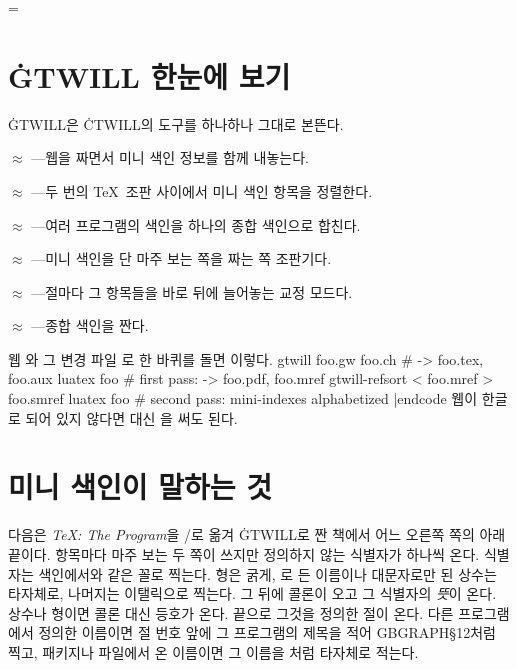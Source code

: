 \headline={\ifodd\pageno\rheader\else\lheader\fi}

\chapter{\.{GTWILL} 한눈에 보기}
\noindent\.{GTWILL}은 \.{CTWILL}의 도구를 하나하나 그대로 본뜬다.

\bull {} $\approx$ ---웹을 짜면서 미니 색인 정보를 함께
내놓는다.

\bull {} $\approx$ ---두 번의 \TeX\ 조판 사이에서
미니 색인 항목을 정렬한다.

\bull {} $\approx$ ---여러 프로그램의 색인을 하나의
종합 색인으로 합친다.

\bull {} $\approx$ ---미니 색인을 단 마주 보는 쪽을
짜는 쪽 조판기다.

\bull {} $\approx$ ---절마다 그 항목들을 바로
뒤에 늘어놓는 교정 모드다.

\bull {} $\approx$ ---종합 색인을 짠다.

\noindent 웹 와 그 변경 파일 로 한 바퀴를 돌면 이렇다.
\begincode
gtwill foo.gw foo.ch                  # -> foo.tex, foo.aux
luatex foo                            # first pass: -> foo.pdf, foo.mref
gtwill-refsort < foo.mref > foo.smref
luatex foo                            # second pass: mini-indexes alphabetized
|endcode
웹이 한글로 되어 있지 않다면  대신 을 써도 된다.

\chapter{미니 색인이 말하는 것}
\noindent 다음은 {\sl \TeX: The Program\/}을 \GO/로 옮겨 \.{GTWILL}로 짠 책에서
어느 오른쪽 쪽의 아래 끝이다.
\samplemini
 {
  }
 {
  }
 {
  }%
항목마다 마주 보는 두 쪽이 쓰지만 정의하지 않는 식별자가 하나씩 온다. 식별자는
색인에서와 같은 꼴로 찍는다. 형은 굵게, 로 든 이름이나 대문자로만 된
상수는 타자체로, 나머지는 이탤릭으로 찍는다. 그 뒤에 콜론이 오고 그 식별자의
{\it 뜻\/}이 온다. 상수나 형이면 콜론 대신 등호가 온다. 끝으로 그것을 정의한
절이 온다. 다른 프로그램에서 정의한 이름이면 절 번호 앞에 그 프로그램의 제목을
적어 {\sc GBGRAPH}\thinspace\S12처럼 찍고, 패키지나 파일에서 온 이름이면 그
이름을 처럼 타자체로 적는다.

